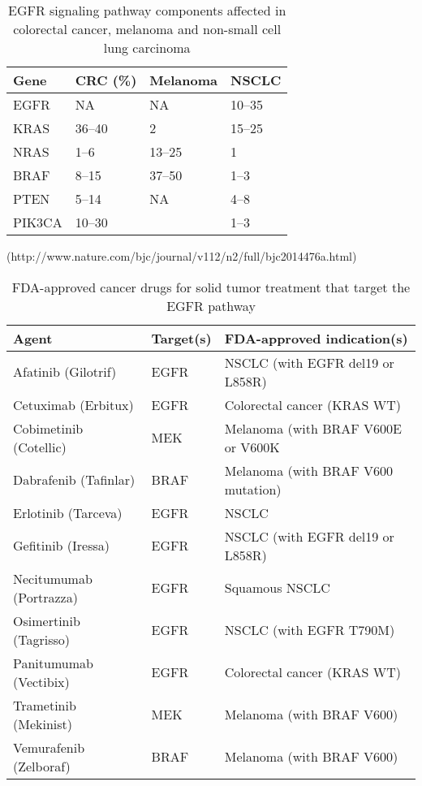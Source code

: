     \begin{table}[!htbp]
        \caption[Occurrence of mutations]{EGFR signaling pathway components affected in colorectal cancer, melanoma and non-small cell lung carcinoma}
        \centering
        \begin{tabular}{ |p{2cm}|p{2cm}|p{2cm}|p{2cm}|}
        \hline
        Gene & CRC (\%) & Melanoma & NSCLC \\ \hline \hline
        EGFR & NA & NA & 10--35 \\
        KRAS & 36--40 & 2 & 15--25 \\
        NRAS & 1--6 & 13--25 & 1 \\
        BRAF & 8--15 & 37--50 & 1--3 \\
        PTEN & 5--14 & NA & 4--8 \\
        PIK3CA & 10--30 & & 1--3 \\
        \hline
      \end{tabular}
    \end{table}
(http://www.nature.com/bjc/journal/v112/n2/full/bjc2014476a.html)

    \begin{table}[!htbp]
        \caption[Targeted Cancer Agents]{FDA-approved cancer drugs for solid tumor treatment that target the EGFR pathway}
        \centering
        \begin{tabular}{ |p{4cm}|p{3.7cm}|p{6.3cm}|}
        \hline
        Agent & Target(s) & FDA-approved indication(s) \\ \hline \hline
        Afatinib (Gilotrif) & EGFR & NSCLC (with EGFR del19 or L858R) \\
        Cetuximab (Erbitux) & EGFR & Colorectal cancer (KRAS WT) \\
        Cobimetinib (Cotellic) & MEK & Melanoma (with BRAF V600E or V600K \\
        Dabrafenib (Tafinlar) & BRAF & Melanoma (with BRAF V600 mutation) \\
        Erlotinib (Tarceva) & EGFR & NSCLC \\
        Gefitinib (Iressa) & EGFR & NSCLC (with EGFR del19 or L858R) \\
        Necitumumab (Portrazza) & EGFR & Squamous NSCLC \\
        Osimertinib (Tagrisso) & EGFR & NSCLC (with EGFR T790M) \\
        Panitumumab (Vectibix) & EGFR & Colorectal cancer (KRAS WT) \\
        Trametinib (Mekinist) & MEK & Melanoma (with BRAF V600) \\
        Vemurafenib (Zelboraf) & BRAF & Melanoma (with BRAF V600) \\
        \hline
      \end{tabular}
    \end{table}

